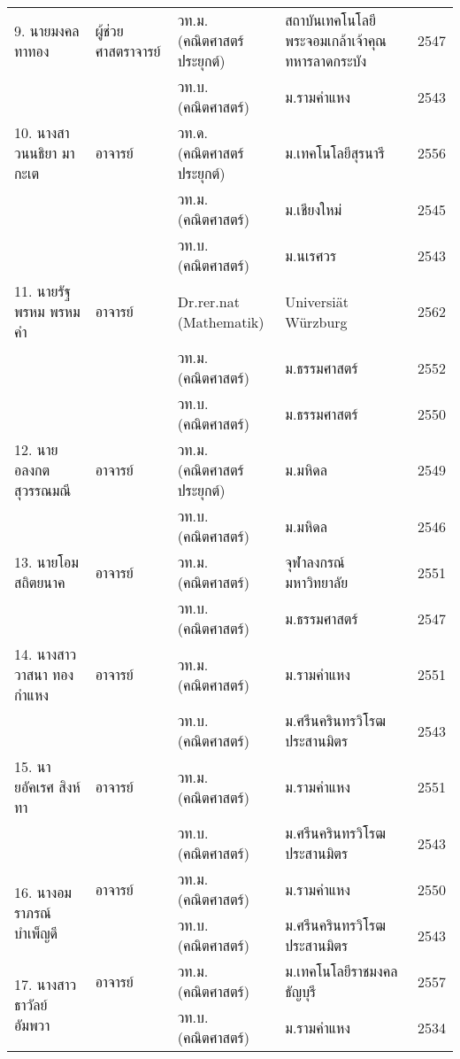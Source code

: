 {\begin{center}
{\begin{longtable}{|p{}|p{}|p{}|p{}|p{}|}
		
		\multirow{1}{*}{9. นายมงคล ทาทอง}&	ผู้ช่วยศาสตราจารย์&วท.ม. (คณิตศาสตร์ประยุกต์)&สถาบันเทคโนโลยีพระจอมเกล้าเจ้าคุณทหารลาดกระบัง&2547\\
		\cline{3-5}
		&&วท.บ. (คณิตศาสตร์)&ม.รามคำแหง&2543\\ \hline
		
		
		\multirow{1}{*}{10. นางสาวนนธิยา มากะเต}&อาจารย์&วท.ด. (คณิตศาสตร์ประยุกต์)&ม.เทคโนโลยีสุรนารี&2556\\\cline{3-5}
		&&วท.ม. (คณิตศาสตร์)&ม.เชียงใหม่&2545\\\cline{3-5}
		&&วท.บ. (คณิตศาสตร์)&	ม.นเรศวร&2543\\\hline
	

		
		\multirow{1}{*}{11. นายรัฐพรหม พรหมคำ}&	อาจารย์&Dr.rer.nat (Mathematik)&Universi\"{a}t W\"{u}rzburg&2562\\\cline{3-5}
		&&วท.ม. (คณิตศาสตร์)& ม.ธรรมศาสตร์&2552\\\cline{3-5}
		&&วท.บ. (คณิตศาสตร์)& ม.ธรรมศาสตร์&2550\\\hline
		
		
		\multirow{1}{*}{12. นายอลงกต สุวรรณมณี}&อาจารย์&วท.ม. (คณิตศาสตร์ประยุกต์)& 	ม.มหิดล&2549\\\cline{3-5}
		&&วท.บ. (คณิตศาสตร์)&ม.มหิดล& 2546\\\hline
		
		
		\multirow{1}{*}{13. นายโอม สถิตยนาค}&อาจารย์	& วท.ม. (คณิตศาสตร์)& จุฬาลงกรณ์มหาวิทยาลัย& 2551\\\cline{3-5}
		&&วท.บ. (คณิตศาสตร์)&ม.ธรรมศาสตร์&2547\\\hline
		
		\multirow{1}{*}{14. นางสาววาสนา ทองกำแหง}&อาจารย์&วท.ม. (คณิตศาสตร์)& ม.รามคำแหง&2551\\\cline{3-5}
		&&วท.บ. (คณิตศาสตร์)&ม.ศรีนครินทรวิโรฒประสานมิตร&2543\\\hline
	
		15. นายอัคเรศ สิงห์ทา\newline &อาจารย์&
		วท.ม. (คณิตศาสตร์)& ม.รามคำแหง&2551\\\cline{3-5}
		&& วท.บ. (คณิตศาสตร์)& 	ม.ศรีนครินทรวิโรฒประสานมิตร&2543\\\hline
	

	\multirow{2}{*}{16. นางอมราภรณ์ บำเพ็ญดี}&	อาจารย์&วท.ม. (คณิตศาสตร์)&ม.รามคำแหง&2550\\\cline{3-5}
	&&วท.บ. (คณิตศาสตร์)&ม.ศรีนครินทรวิโรฒประสานมิตร&2543\\\hline
	

	\multirow{2}{*}{17. นางสาวธาวัลย์ อัมพวา}&	อาจารย์&วท.ม. (คณิตศาสตร์)&ม.เทคโนโลยีราชมงคลธัญบุรี&2557\\\cline{3-5}
	&&วท.บ. (คณิตศาสตร์)&ม.รามคำแหง&2534\\\hline 


\end{longtable}}
\end{center}}
